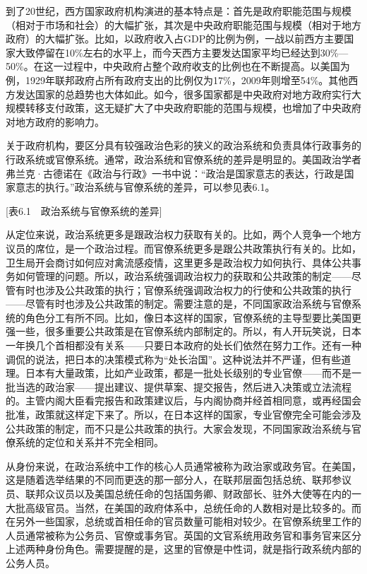 到了20世纪，西方国家政府机构演进的基本特点是：首先是政府职能范围与规模（相对于市场和社会）的大幅扩张，其次是中央政府职能范围与规模（相对于地方政府）的大幅扩张。比如，以政府收入占GDP的比例为例，一战以前西方主要国家大致停留在10\%左右的水平上，而今天西方主要发达国家平均已经达到30\%—50\%。在这一过程中，中央政府占整个政府收支的比例也在不断提高。以美国为例，1929年联邦政府占所有政府支出的比例仅为17\%，2009年则增至54\%。其他西方发达国家的总趋势也大体如此。如今，很多国家都是中央政府对地方政府实行大规模转移支付政策，这无疑扩大了中央政府职能的范围与规模，也增加了中央政府对地方政府的影响力。


关于政府机构，要区分具有较强政治色彩的狭义的政治系统和负责具体行政事务的行政系统或官僚系统。通常，政治系统和官僚系统的差异是明显的。美国政治学者弗兰克·古德诺在《政治与行政》一书中说：“政治是国家意志的表达，行政是国家意志的执行。”政治系统与官僚系统的差异，可以参见表6.1。

[表6.1　政治系统与官僚系统的差异]

从定位来说，政治系统更多是跟政治权力获取有关的。比如，两个人竞争一个地方议员的席位，是一个政治过程。而官僚系统更多是跟公共政策执行有关的。比如，卫生局开会商讨如何应对禽流感疫情，这里更多是政治权力如何执行、具体公共事务如何管理的问题。所以，政治系统强调政治权力的获取和公共政策的制定——尽管有时也涉及公共政策的执行；官僚系统强调政治权力的行使和公共政策的执行——尽管有时也涉及公共政策的制定。需要注意的是，不同国家政治系统与官僚系统的角色分工有所不同。比如，像日本这样的国家，官僚系统的主导型要比美国更强一些，很多重要公共政策是在官僚系统内部制定的。所以，有人开玩笑说，日本一年换几个首相都没有关系——只要日本政府的处长们依然在努力工作。还有一种调侃的说法，把日本的决策模式称为“处长治国”。这种说法并不严谨，但有些道理。日本有大量政策，比如产业政策，都是一批处长级别的专业官僚——而不是一批当选的政治家——提出建议、提供草案、提交报告，然后进入决策或立法流程的。主管内阁大臣看完报告和政策建议后，与内阁协商并经首相同意，或再经国会批准，政策就这样定下来了。所以，在日本这样的国家，专业官僚完全可能会涉及公共政策的制定，而不只是公共政策的执行。大家会发现，不同国家政治系统与官僚系统的定位和关系并不完全相同。

从身份来说，在政治系统中工作的核心人员通常被称为政治家或政务官。在美国，这是随着选举结果的不同而更迭的那一部分人，在联邦层面包括总统、联邦参议员、联邦众议员以及美国总统任命的包括国务卿、财政部长、驻外大使等在内的一大批高级官员。当然，在美国的政府体系中，总统任命的人数相对是比较多的。而在另外一些国家，总统或首相任命的官员数量可能相对较少。在官僚系统里工作的人员通常被称为公务员、官僚或事务官。英国的文官系统用政务官和事务官来区分上述两种身份角色。需要提醒的是，这里的官僚是中性词，就是指行政系统内部的公务人员。

